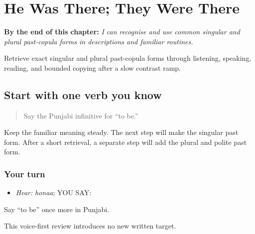 
\chapter{He Was There; They Were There}
\label{ch:pa-a2-past-copula}

\begin{chapteropening}
\textbf{By the end of this chapter:} \emph{I can recognise and use common singular and plural past-copula forms in descriptions and familiar routines.}

Retrieve exact singular and plural past-copula forms through listening, speaking, reading, and bounded copying after a slow contrast ramp.
\end{chapteropening}

\section[(past copula return)]{Start with one verb you know}

\label{lesson:PA-C187-past-return}



\begin{quote}
Say the Punjabi infinitive for “to be.”
\end{quote}

\begin{grammarlens}[title={Grammar Lens: one past contrast at a time}]
Keep the familiar meaning steady. The next step will make the singular past form. After a short retrieval, a separate step will add the plural and polite past form.
\end{grammarlens}

\subsection*{Your turn}
\begin{itemize}
\raggedright
  \item \emph{Hear:} \emph{honaa}; YOU SAY: \textbf{}
\end{itemize}

\begin{tcolorbox}[breakable,colback=teal!4,colframe=teal!35!black,title={Before you move on}]
Say “to be” once more in Punjabi.

This voice-first review introduces no new written target.
\end{tcolorbox}
